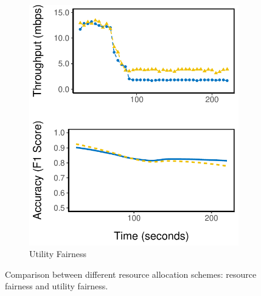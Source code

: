 \begin{figure}
\begin{subfigure}[t]{0.49\columnwidth}
    \includegraphics[width=\textwidth]{figures/multitask-eq-acc.pdf}
    \caption{Utility Fairness}
    \label{fig:eq-acc}
  \end{subfigure}
  \caption{Comparison between different resource allocation schemes:
    resource fairness and utility fairness.}
  \label{fig:multitask}
\end{figure}

